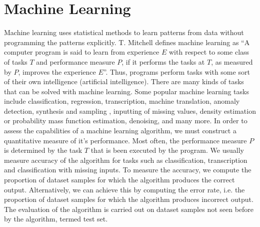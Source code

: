 \documentclass[master]{thesis-uestc}
\begin{document}
\section{Machine Learning}
Machine learning uses statistical methods to learn patterns from data without programming the patterns explicitly. T. Mitchell defines machine learning as ``A computer program is said to learn from experience $E$ with respect to some class of tasks $T$ and performance measure $P$, if it performs the tasks at $T$, as measured by $P$, improves the experience $E$''. Thus, programs perform tasks with some sort of their own intelligence (artificial intelligence). There are many kinds of tasks that can be solved with machine learning. Some popular machine learning tasks include classification, regression, transcription, machine translation, anomaly detection, synthesis and sampling , inputting of missing values, density estimation or probability mass function estimation, denoising, and many more. In order to assess the capabilities of a machine learning algorithm, we must construct a quantitative measure of it's performance. Most often, the performance measure $P$ is determined by the task $T$ that is been executed by the program. We usually measure accuracy of the algorithm for tasks such as classification, transcription and classification with missing inputs. To measure the accuracy, we compute the proportion of dataset samples for which the algorithm produces the correct output. Alternatively, we can achieve this by computing the error rate, i.e. the proportion of dataset samples for which the algorithm produces incorrect output. The evaluation of the algorithm is carried out on dataset samples not seen before by the algorithm, termed test set.
\end{document}

